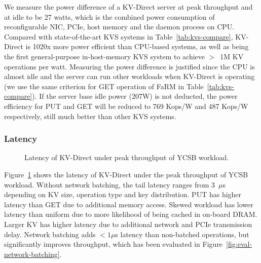 We measure the power difference of a KV-Direct server at peak throughput and at idle to be 27 watts, which is the combined power consumption of reconfigurable NIC, PCIe, host memory and the daemon process on CPU.
Compared with state-of-the-art KVS systems in Table~\ref{tab:kvs-compare}, KV-Direct is 10\approx20x more power efficient than CPU-based systems, as well as being the first general-purpose in-host-memory KVS system to achieve $>$~1M KV operations per watt. Measuring the power difference is justified since the CPU is almost idle and the server can run other workloads when KV-Direct is operating (we use the same criterion for GET operation of FaRM in Table~\ref{tab:kvs-compare}).
If the server base idle power (207W) is not deducted, the power efficiency for PUT and GET will be reduced to 769 Kops/W and 487 Kops/W respectively, still much better than other KVS systems.
\subsubsection{Latency}
\begin{figure}[t]
\centering
{}
\caption{Latency of KV-Direct under peak throughput of YCSB workload.}
\label{fig:ycsb-lat}
\vspace{-15pt}
\end{figure}

Figure~\ref{fig:ycsb-lat} shows the latency of KV-Direct under the peak throughput of YCSB workload.
Without network batching, the tail latency ranges from 3~$\mu$s depending on KV size, operation type and key distribution.
PUT has higher latency than GET due to additional memory access.
Skewed workload has lower latency than uniform due to more likelihood of being cached in on-board DRAM.
Larger KV has higher latency due to additional network and PCIe transmission delay.
Network batching adds $< 1 \mu$s latency than non-batched operations, but significantly improves throughput, which has been evaluated in Figure~\ref{fig:eval-network-batching}.

